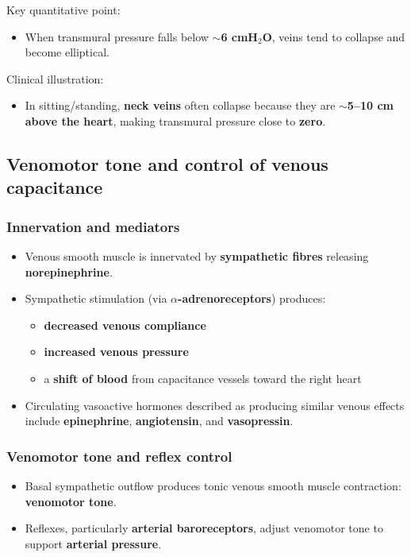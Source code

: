 \documentclass[11pt,a4paper]{article}
\begin{document}
Key quantitative point:
\begin{itemize}
\item When transmural pressure falls below \textbf{$\sim$6 cmH$_2$O}, veins tend to collapse and become elliptical.
\end{itemize}

Clinical illustration:
\begin{itemize}
\item In sitting/standing, \textbf{neck veins} often collapse because they are \textbf{$\sim$5--10 cm above the heart}, making transmural pressure close to \textbf{zero}.
\end{itemize}

\subsection{Venomotor tone and control of venous capacitance}

\subsubsection{Innervation and mediators}
\begin{itemize}
\item Venous smooth muscle is innervated by \textbf{sympathetic fibres} releasing \textbf{norepinephrine}.
\item Sympathetic stimulation (via \textbf{$\alpha$-adrenoreceptors}) produces:
  \begin{itemize}
  \item \textbf{decreased venous compliance}
  \item \textbf{increased venous pressure}
  \item a \textbf{shift of blood} from capacitance vessels toward the right heart
  \end{itemize}
\item Circulating vasoactive hormones described as producing similar venous effects include \textbf{epinephrine}, \textbf{angiotensin}, and \textbf{vasopressin}.
\end{itemize}

\subsubsection{Venomotor tone and reflex control}
\begin{itemize}
\item Basal sympathetic outflow produces tonic venous smooth muscle contraction: \textbf{venomotor tone}.
\item Reflexes, particularly \textbf{arterial baroreceptors}, adjust venomotor tone to support \textbf{arterial pressure}.
\end{itemize}
\end{document}
